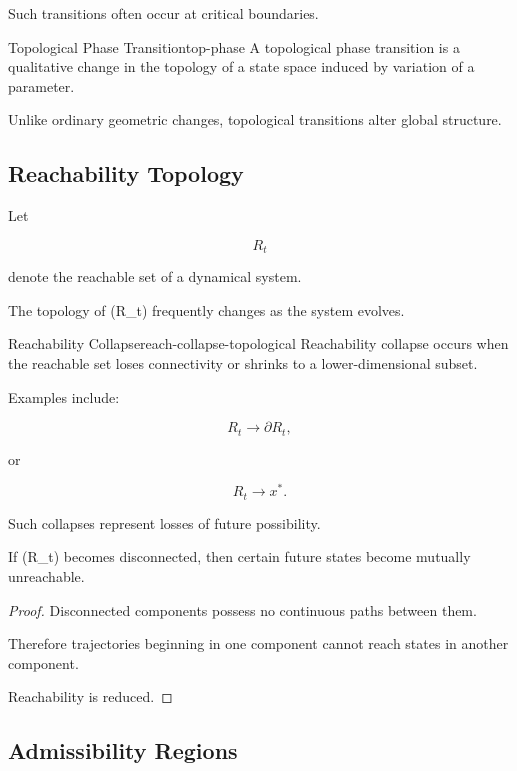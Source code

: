 \documentclass[12pt,twoside,openright]{book}
\newenvironment{prop}
{\begin{proposition}{}{}}
{\end{proposition}}
\begin{document}
Such transitions often occur at critical boundaries.

\begin{definition}{Topological Phase Transition}{top-phase}
A topological phase transition is a qualitative change in
the topology of a state space induced by variation of a
parameter.
\end{definition}

Unlike ordinary geometric changes, topological
transitions alter global structure.

\subsection{Reachability Topology}

Let

\[
R_t
\]

denote the reachable set of a dynamical system.

The topology of (R_t) frequently changes as the system
evolves.

\begin{definition}{Reachability Collapse}{reach-collapse-topological}
Reachability collapse occurs when the reachable set loses
connectivity or shrinks to a lower-dimensional subset.
\end{definition}

Examples include:

\[
R_t
\rightarrow
\partial R_t,
\]

or

\[
R_t
\rightarrow
{x^*}.
\]

Such collapses represent losses of future possibility.

\begin{prop}
If (R_t) becomes disconnected, then certain future
states become mutually unreachable.
\end{prop}

\begin{proof}
Disconnected components possess no continuous paths
between them.

Therefore trajectories beginning in one component cannot
reach states in another component.

Reachability is reduced.
\end{proof}

\subsection{Admissibility Regions}
\end{document}

